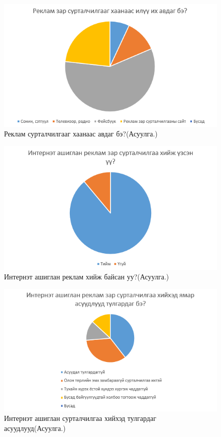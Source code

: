 \begin{figure}[htbp]
	\centering
	\includegraphics[scale=0.7]{Chart/Chart4}
	\caption[Хэрэглэгчийн судалгаа]{Реклам сурталчилгааг хаанаас авдаг бэ?(Асуулга.)}
	\label{fig:Chart4}
\end{figure}
\begin{figure}[htbp]
	\centering
	\includegraphics[scale=0.7]{Chart/Chart5}
	\caption[Хэрэглэгчийн судалгаа]{Интернэт ашиглан реклам хийж байсан уу?(Асуулга.)}
	\label{fig:Chart5}
\end{figure}

\begin{figure}[htbp]
	\centering
	\includegraphics[scale=0.7]{Chart/Chart6}
	\caption[Интернэт ашиглан сурталчилгаа хийхэд тулгардаг асуудлууд]{Интернэт ашиглан сурталчилгаа хийхэд тулгардаг асуудлууд(Асуулга.)}
	\label{fig:Chart6}
\end{figure}

